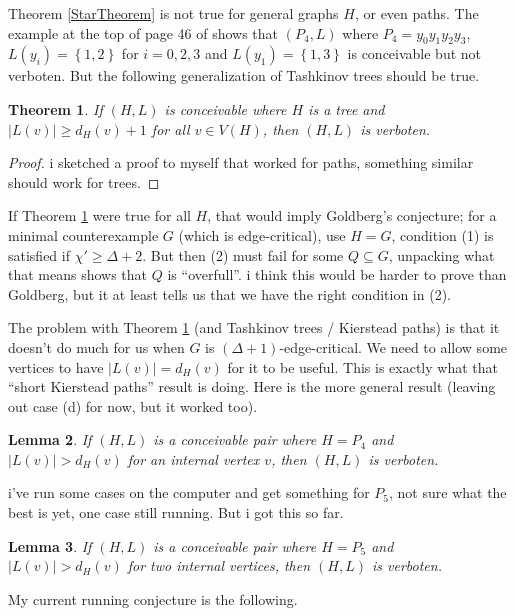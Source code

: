 \documentclass[12pt]{amsart}
\theoremstyle{plain}
\newtheorem{thm}{Theorem}
\newtheorem{lem}[thm]{Lemma}
\theoremstyle{definition}
\theoremstyle{remark}
\newcommand{\set}[1]{\left\{ #1 \right\}}
\begin{document}
Theorem \ref{StarTheorem} is not true for general graphs $H$, or even paths.  The example at the top of page 46 of \cite{stiebitz2012graph} shows that $(P_4, L)$ where $P_4 = y_0y_1y_2y_3$, $L(y_i) = \set{1,2}$ for $i = 0, 2, 3$ and $L(y_1) = \set{1,3}$ is conceivable but not verboten.  But the following generalization of Tashkinov trees should be true.

\begin{thm}\label{TreeTheorem}
If $(H, L)$ is conceivable where $H$ is a tree and $|L(v)| \ge d_H(v) + 1$ for all $v \in V(H)$, then $(H, L)$ is verboten.
\end{thm}
\begin{proof}
i sketched a proof to myself that worked for paths, something similar should work for trees.
\end{proof}

If Theorem \ref{TreeTheorem} were true for all $H$, that would imply Goldberg's conjecture; for a minimal counterexample $G$ (which is edge-critical), use $H = G$, condition (1) is satisfied if $\chi' \ge \Delta + 2$. But then (2) must fail for some $Q \subseteq G$, unpacking what that means shows that $Q$ is ``overfull''.  i think this would be harder to prove than Goldberg, but it at least tells us that we have the right condition in (2).

The problem with Theorem \ref{TreeTheorem} (and Tashkinov trees / Kierstead paths) is that it doesn't do much for us when $G$ is $(\Delta + 1)$-edge-critical.  
We need to allow some vertices to have $|L(v)| = d_H(v)$ for it to be useful.  This is exactly what that ``short Kierstead paths'' result is doing.  Here is the more general result (leaving out case (d) for now, but it worked too).

\begin{lem}\label{PathLengthFour}
If $(H, L)$ is a conceivable pair where $H = P_4$ and $|L(v)| > d_H(v)$ for an internal vertex $v$, then $(H, L)$ is verboten.
\end{lem}

i've run some cases on the computer and get something for $P_5$, not sure what the best is yet, one case still running.  But i got this so far.

\begin{lem}\label{PathLengthFive}
If $(H, L)$ is a conceivable pair where $H = P_5$ and $|L(v)| > d_H(v)$ for two internal vertices, then $(H, L)$ is verboten.
\end{lem}

My current running conjecture is the following.
\end{document}
